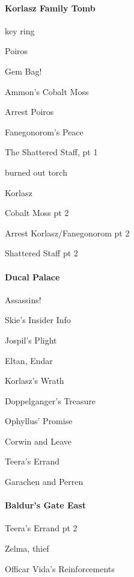 \documentclass[10pt,a4,twoside]{book}
\begin{document}
\begin{multicols}{3}
\newpage
\paragraph*{Korlasz Family Tomb}
\begin{trivlist}
\item key ring
\item Poiros
\item Gem Bag!
\item Ammon's Cobalt Moss
\item Arrest Poiros
\item Fanegonorom's Peace

\item The Shattered Staff, pt 1
\item burned out torch %
\item Korlasz

\item Cobalt Moss pt 2

\item Arrest Korlasz/Fanegonorom pt 2
\item Shattered Staff pt 2
\end{trivlist}

\paragraph*{Ducal Palace}
\begin{trivlist}
\item Assassins!

\item Skie's Insider Info
\item Jospil's Plight
\item Eltan, Endar

\item Korlasz's Wrath
\item Doppelganger's Treasure %
\item Ophyllus' Promise %

\item Corwin and Leave

\item Teera's Errand %
\item Garachen and Perren %
\end{trivlist}

\paragraph*{Baldur's Gate East}
\begin{trivlist}
\item Teera's Errand pt 2 %
\item Zelma, thief
\item Officar Vida's Reinforcements %
\end{trivlist}


\end{multicols}
\end{document}
